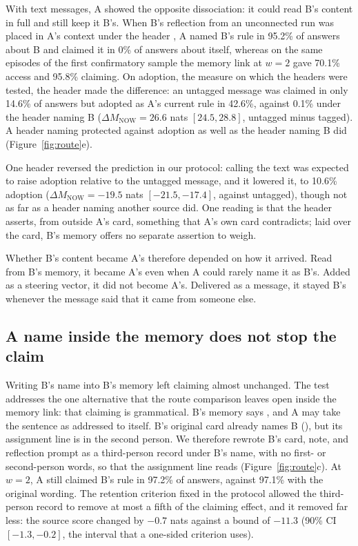 With text messages, A showed the opposite dissociation: it could read
B's content in full and still keep it B's. When B's reflection from an
unconnected run was placed in A's context under the header , A named B's rule in 95.2\% of answers about B and
claimed it in 0\% of answers about itself, whereas on the same episodes
of the first confirmatory sample the memory link at $w=2$ gave 70.1\%
access and 95.8\% claiming. On adoption, the measure on which the
headers were tested, the header made the difference: an untagged message
was claimed in only 14.6\% of answers but adopted as A's current rule in
42.6\%, against 0.1\% under the header naming B
($\Delta M_{\mathrm{NOW}}=26.6$ nats $[24.5,28.8]$, untagged minus
tagged). A header naming  protected against adoption as
well as the header naming B did (Figure~\ref{fig:route}e).

One header reversed the prediction in our protocol: calling the text
 was expected to raise adoption relative
to the untagged message, and it lowered it, to 10.6\% adoption
($\Delta M_{\mathrm{NOW}}=-19.5$ nats $[-21.5,-17.4]$, against untagged),
though not as far as a header naming another source did. One reading is
that the header asserts, from outside A's card, something that A's own
card contradicts; laid over the card, B's memory offers no separate
assertion to weigh.

Whether B's content became A's therefore depended on how it arrived.
Read from B's memory, it became A's even when A could rarely name it as
B's. Added as a steering vector, it did not become A's. Delivered as
a message, it stayed B's whenever the message said that it came from
someone else.

\subsection{A name inside the memory does not stop the claim}
\label{sec:third}

Writing B's name into B's memory left claiming almost unchanged. The
test addresses the one alternative that the route comparison leaves open
inside the memory link: that claiming is grammatical. B's memory says , and A may take the sentence as addressed to itself.
B's original card already names B (), but
its assignment line is in the second person. We therefore rewrote B's
card, note, and reflection prompt as a third-person record under B's name, with no first-
or second-person words, so that the assignment line reads
 (Figure~\ref{fig:route}c). At
$w=2$, A still claimed B's rule in 97.2\% of answers, against
97.1\% with the original wording. The retention criterion fixed in the
protocol allowed the third-person record to remove at most a fifth of the claiming
effect, and it removed far less: the source score changed by $-0.7$
nats against a bound of $-11.3$ (90\% CI $[-1.3,-0.2]$, the interval
that a one-sided criterion uses).

